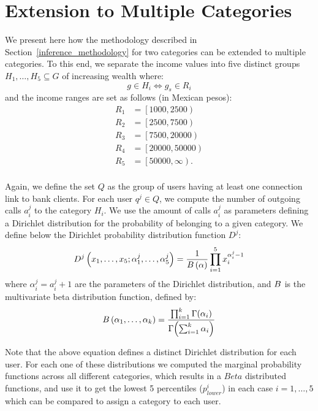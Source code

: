 \section{Extension to Multiple Categories}

We present here how the methodology described in Section~\ref{inference_methodology} for
two categories can be extended to multiple categories.
To this end, we separate the income values into five distinct groups $ H_1, \ldots, H_5 \subseteq G$ of increasing wealth where:
\[
	g \in H_i \iff g_s \in R_i
\]
and the income ranges are set as follows (in Mexican pesos):
\begin{align*}
	R_1 &= \left[1000, 2500\right) \\
	R_2 &= \left[2500, 7500\right) \\
	R_3 &= \left[7500, 20000\right) \\
	R_4 &= \left[20000, 50000\right) \\
	R_5 &= \left[50000, \infty\right). \\
\end{align*}

Again, we define the set $Q$ as the group of users having at least one connection link to bank clients. For each user $q^j \in Q$, we compute the number of outgoing calls $a^j_i$ to the category $H_i$. 
We use the amount of calls $a^j_i$  as parameters defining a Dirichlet distribution for the probability of belonging to a given category. 
We define below the Dirichlet probability distribution function $D^j$:  
\begin{equation}
D^j \left( x_1, \ldots, x_5; \alpha^j_1, \ldots, \alpha^j_5 \right) = \frac{1}{B \left( \alpha \right)} \prod^5_{i = 1} x_i^{\alpha^j_i - 1}
\label{Dirichlet}
\end{equation}
where $\alpha^j_i = a^j_i +1$ are the parameters of the Dirichlet distribution, and $B$ is the multivariate beta distribution function, defined by: %
\begin{equation}
B \left( \alpha_1, \ldots, \alpha_k \right) = \frac{\prod^k_{i = 1} \Gamma \! \left( \alpha_i \right)}{\Gamma \! \left( \sum^k_{i = 1} \alpha_i \right) }
\label{Beta} 
\end{equation}

Note that the above equation defines a distinct Dirichlet distribution for each user. For each one of these distributions we computed the marginal probability functions across all different categories, which results in a $Beta$ distributed functions, and use it to get the  lowest 5 percentiles ($p^i_{lower}$) in each case ${i=1, \ldots, 5}$ which can be compared to assign a category to each user. 


